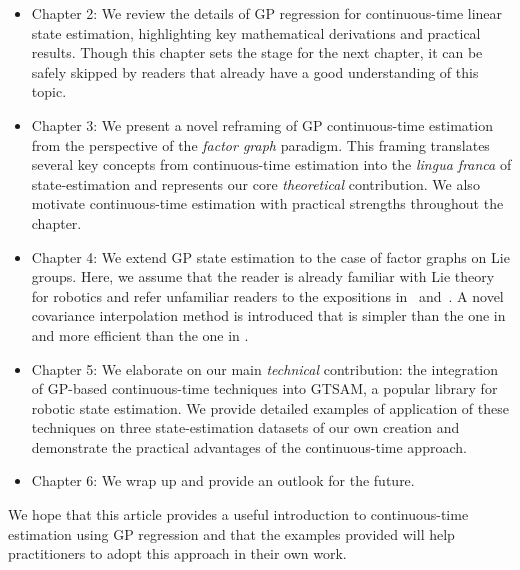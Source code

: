 \begin{itemize}
\item Chapter 2: We review the details of \ac{GP} regression for continuous-time linear state estimation, highlighting key mathematical derivations and practical results. Though this chapter sets the stage for the next chapter, it can be safely skipped by readers that already have a good understanding of this topic.
\item Chapter 3: We present a novel reframing of \ac{GP} continuous-time estimation from the perspective of the {\em factor graph} paradigm. This framing translates several key concepts from continuous-time estimation into the {\em lingua franca} of state-estimation and represents our core \emph{theoretical} contribution. We also motivate continuous-time estimation with practical strengths throughout the chapter.
\item Chapter 4:  We extend \ac{GP} state estimation to the case of factor graphs on Lie groups. Here, we assume that the reader is already familiar with Lie theory for robotics and refer unfamiliar readers to the expositions in~\citet{solaMicroLieTheory2021} and~\citet{barfoot_ser24}. A novel covariance interpolation method is introduced that is simpler than the one in \citet{anderson_phd16} and more efficient than the one in \citet{barfoot_ser24}.
\item Chapter 5:  We elaborate on our main \emph{technical} contribution: the integration of \ac{GP}-based continuous-time techniques into \ac{GTSAM}, a popular library for robotic state estimation. We provide detailed examples of application of these techniques on three state-estimation datasets of our own creation and demonstrate the practical advantages of the continuous-time approach.
\item Chapter 6:  We wrap up and provide an outlook for the future.
\end{itemize}
We hope that this article provides a useful introduction to continuous-time estimation using \ac{GP} regression and that the examples provided will help practitioners to adopt this approach in their own work.
